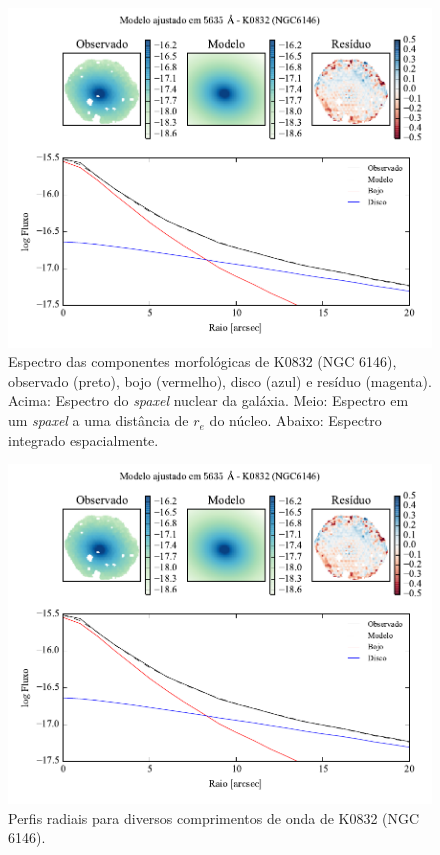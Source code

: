 \begin{figure}
	\includegraphics[page=4]{figuras-decomp/K0832_sample006a}
	\caption[Espectro das componentes morfológicas de K0832 (NGC 6146)]
	{Espectro das componentes morfológicas de K0832 (NGC 6146),
	observado (preto), bojo (vermelho), disco (azul) e resíduo (magenta). Acima:
	Espectro do {\em spaxel} nuclear da galáxia. Meio: Espectro em um {\em spaxel}
	a uma distância de $r_e$ do núcleo. Abaixo: Espectro integrado espacialmente.}
	\label{fig:decompSpectra:K0832}
\end{figure}

\begin{figure}
	\includegraphics[page=5]{figuras-decomp/K0832_sample006a}
	\caption[Perfis radiais para diversos comprimentos de onda de K0832 (NGC 6146)]
	{Perfis radiais para diversos comprimentos de onda de K0832 (NGC 6146).}
	\label{fig:decompRadprofSpec:K0832}
\end{figure}

